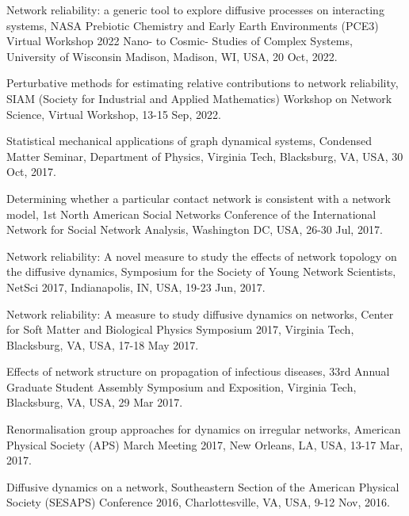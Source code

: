 \begin{zitemize}
\item
Network reliability: a generic tool to explore diffusive processes on interacting systems, NASA Prebiotic Chemistry and Early Earth Environments (PCE3) Virtual Workshop 2022 Nano- to Cosmic- Studies of Complex Systems, University of Wisconsin Madison, Madison, WI, USA, 20 Oct, 2022.

\item
Perturbative methods for estimating relative contributions to network reliability, SIAM (Society for Industrial and Applied Mathematics) Workshop on Network Science, Virtual Workshop, 13-15 Sep, 2022.

\item
Statistical mechanical applications of graph dynamical systems, Condensed Matter Seminar, Department of Physics, Virginia Tech, Blacksburg, VA, USA, 30 Oct, 2017.

\item
Determining whether a particular contact network is consistent with a network model, 1st North American Social Networks Conference of the International Network for Social Network Analysis, Washington DC, USA, 26-30 Jul, 2017.

\item
Network reliability: A novel measure to study the effects of network topology on the diffusive dynamics, Symposium for the Society of Young Network Scientists, NetSci 2017, Indianapolis, IN, USA, 19-23 Jun, 2017.

\item
Network reliability: A measure to study diffusive dynamics on networks, Center for Soft Matter and Biological Physics Symposium 2017, Virginia Tech, Blacksburg, VA, USA, 17-18 May 2017.

\item
Effects of network structure on propagation of infectious diseases, 33rd Annual Graduate Student Assembly Symposium and Exposition, Virginia Tech, Blacksburg, VA, USA, 29 Mar 2017.

\item
Renormalisation group approaches for dynamics on irregular networks, American Physical Society (APS) March Meeting 2017, New Orleans, LA, USA, 13-17 Mar, 2017.

\item
Diffusive dynamics on a network, Southeastern Section of the American Physical Society (SESAPS) Conference 2016, Charlottesville, VA, USA, 9-12 Nov, 2016.


\end{zitemize}
